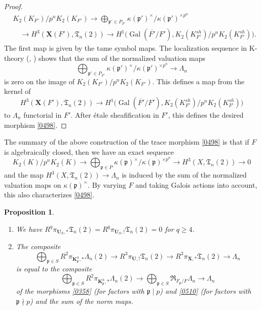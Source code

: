 \documentclass{amsart}
\newtheorem{Prop}[Thm]{Proposition}
\theoremstyle{remark}
\numberwithin{equation}{subsection}
\newcommand{\closure}[1]{\overline{#1}}
\newcommand{\alg}[1]{\mathbf{#1}}
\newcommand{\ideal}[1]{\mathfrak{#1}}
\newcommand{\Weil}{\mathfrak{R}}
\DeclareMathOperator{\Gal}{Gal}
\begin{document}
\begin{proof}
\begin{align*}
			&		K_{2}(K_{F'}) / p^{n} K_{2}(K_{F'})
				\to
					\bigoplus_{\ideal{p}' \in P_{F'}}
						\kappa(\ideal{p}')^{\times} / \kappa(\ideal{p}')^{\times p^{n}}
			\\
			&	\quad
				\to
					H^{3}(\alg{X}(F'), \mathfrak{T}_{n}(2))
				\to
					H^{1} \bigl(
						\Gal(\closure{F'} / F'),
						K_{2}(K_{F'}^{sh}) / p^{n} K_{2}(K_{F'}^{sh})
					\bigr).
		\end{align*}
	The first map is given by the tame symbol maps.
	The localization sequence in K-theory
	(\cite[Chapter V, Proposition 9.2]{Wei13},
	\cite[(0.3)]{Sai87}) shows that the sum of the normalized valuation maps
		\[
				\bigoplus_{\ideal{p}' \in P_{F'}}
					\kappa(\ideal{p}')^{\times} / \kappa(\ideal{p}')^{\times p^{n}}
			\to
				\Lambda_{n}
		\]
	is zero on the image of $K_{2}(K_{F'}) / p^{n} K_{2}(K_{F'})$.
	This defines a map from the kernel of
		\[
				H^{3}(\alg{X}(F'), \mathfrak{T}_{n}(2))
			\to
				H^{1} \bigl(
					\Gal(\closure{F'} / F'),
					K_{2}(K_{F'}^{sh}) / p^{n} K_{2}(K_{F'}^{sh})
				\bigr)
		\]
	to $\Lambda_{n}$ functorial in $F'$.
	After \'etale sheafification in $F'$,
	this defines the desired morphism \eqref{0498}.
\end{proof}

The summary of the above construction of the trace morphism \eqref{0498} is that
if $F$ is algebraically closed, then we have an exact sequence
	\[
			K_{2}(K) / p^{n} K_{2}(K)
		\to
			\bigoplus_{\ideal{p} \in P}
				\kappa(\ideal{p})^{\times} / \kappa(\ideal{p})^{\times p^{n}}
		\to
			H^{3}(X, \mathfrak{T}_{n}(2))
		\to
			0
	\]
and the map $H^{3}(X, \mathfrak{T}_{n}(2)) \to \Lambda_{n}$ is induced by the sum of the normalized valuation maps
on $\kappa(\ideal{p})^{\times}$.
By varying $F$ and taking Galois actions into account, this also characterizes \eqref{0498}.

\begin{Prop} \mbox{} \label{0422}
	\begin{enumerate}
		\item \label{0511}
			We have
				$
						R^{q} \pi_{\alg{U}_{S}, \ast} \mathfrak{T}_{n}(2)
					=
						R^{q} \pi_{\alg{U}_{S}, !} \mathfrak{T}_{n}(2)
					=
						0
				$
			for $q \ge 4$.
		\item \label{0512}
			The composite
				\[
						\bigoplus_{\ideal{p} \in S}
							R^{2} \pi_{\alg{K}_{\ideal{p}}^{h}, \ast} \Lambda_{n}(2)
					\to
						R^{3} \pi_{\alg{U}, !} \mathfrak{T}_{n}(2)
					\to
						R^{3} \pi_{\alg{X}, \ast} \mathfrak{T}_{n}(2)
					\to
						\Lambda_{n}
				\]
			is equal to the composite
				\[
						\bigoplus_{\ideal{p} \in S}
							R^{2} \pi_{\alg{K}_{\ideal{p}}^{h}, \ast} \Lambda_{n}(2)
					\to
						\bigoplus_{\ideal{p} \in S}
							\Weil_{F_{\ideal{p}} / F} \Lambda_{n}
					\to
						\Lambda_{n}
				\]
			of the morphisms \eqref{0358} (for factors with $\ideal{p} \mid p$)
			and \eqref{0510} (for factors with $\ideal{p} \nmid p$)
			and the sum of the norm maps.
	\end{enumerate}
\end{Prop}
\end{document}

